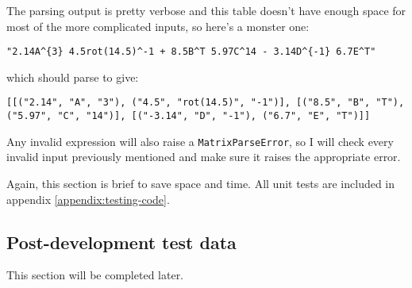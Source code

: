 \documentclass[../main.tex]{subfiles}
\begin{document}
The parsing output is pretty verbose and this table doesn't have enough space for most of the more complicated inputs, so here's a monster one:
\begin{center}
\texttt{"2.14A\textasciicircum\{3\} 4.5rot(14.5)\textasciicircum-1 + 8.5B\textasciicircum T 5.97C\textasciicircum14 - 3.14D\textasciicircum\{-1\} 6.7E\textasciicircum T"}
\end{center}
which should parse to give:
\begin{center}
\texttt{[[("2.14", "A", "3"), ("4.5", "rot(14.5)", "-1")], [("8.5", "B", "T"), ("5.97", "C", "14")], [("-3.14", "D", "-1"), ("6.7", "E", "T")]]}
\end{center}

Any invalid expression will also raise a \texttt{MatrixParseError}, so I will check every invalid input previously mentioned and make sure it raises the appropriate error.

Again, this section is brief to save space and time. All unit tests are included in appendix \ref{appendix:testing-code}.

\subsection{Post-development test data\label{design:post-development-test-data}}

This section will be completed later.
\end{document}
